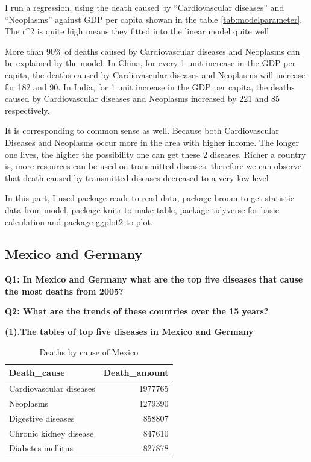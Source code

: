 \documentclass[11pt,a4paper,]{article}
\begin{document}
I run a regression, using the death caused by ``Cardiovascular diseases'' and ``Neoplasms'' against GDP per capita showan in the table \ref{tab:modelparameter}. The r\^{}2 is quite high means they fitted into the linear model quite well

More than 90\% of deaths caused by Cardiovascular diseases and Neoplasms can be explained by the model. In China, for every 1 unit increase in the GDP per capita, the deaths caused by Cardiovascular diseases and Neoplasms will increase for 182 and 90. In India, for 1 unit increase in the GDP per capita, the deaths caused by Cardiovascular diseases and Neoplasms increased by 221 and 85 respectively.

It is corresponding to common sense as well. Because both Cardiovascular Diseases and Neoplasms occur more in the area with higher income. The longer one lives, the higher the possibility one can get these 2 diseases. Richer a country is, more resources can be used on transmitted diseases. therefore we can observe that death caused by transmitted diseases decreased to a very low level

In this part, I used package readr \textcite{readr} to read data, package broom \textcite{broom} to get statistic data from model, package knitr \textcite{knitr} to make table, package tidyverse \textcite{tidyverse} for basic calculation and package ggplot2 \textcite{ggplot2} to plot.

\clearpage

\hypertarget{mexico-and-germany}{%
\subsection{Mexico and Germany}\label{mexico-and-germany}}

\textbf{Q1: In Mexico and Germany what are the top five diseases that cause the most deaths from 2005?}

\textbf{Q2: What are the trends of these countries over the 15 years?}

\textbf{(1).The tables of top five diseases in Mexico and Germany}

\begin{table}

\caption{\label{tab:Mexicotable}Deaths by cause of Mexico}
\centering
\begin{tabular}[t]{l|r}
\hline
Death\_cause & Death\_amount\\
\hline
Cardiovascular diseases & 1977765\\
\hline
Neoplasms & 1279390\\
\hline
Digestive diseases & 858807\\
\hline
Chronic kidney disease & 847610\\
\hline
Diabetes mellitus & 827878\\
\hline
\end{tabular}
\end{table}
\end{document}
